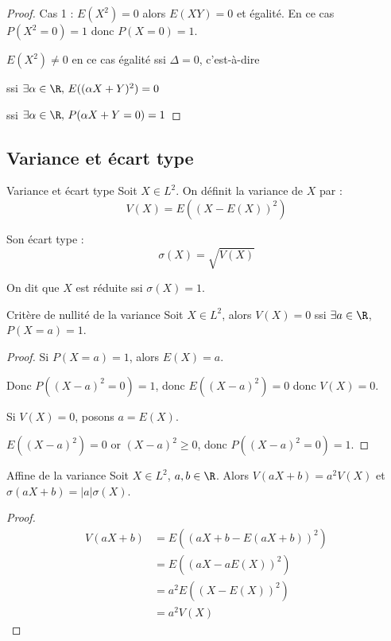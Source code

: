 \begin{proof}
    Cas 1 : $E(X^2) = 0$ alors $E(XY) =0$ et égalité. En ce cas $P(X^2 = 0) = 1$ donc 
    $P(X = 0) = 1$.

     $E(X^2) \neq 0$ en ce cas égalité ssi $\Delta = 0$, c'est-à-dire
    
    ssi $\exists \alpha \in \R, \, E((\alpha X + Y)^2) = 0$

    ssi $\exists \alpha \in \R, \, P(\alpha X + Y = 0) = 1$
\end{proof}

\subsection{Variance et écart type }

\begin{definition}{Variance et écart type}{}
    Soit $X \in L^2$. On définit la variance de $X$ par : 
    $$V(X) = E\left( (X - E(X))^2 \right) $$

    Son écart type : 
    $$ \sigma(X) = \sqrt{V(X)} $$

    On dit que $X$ est réduite ssi $\sigma(X) = 1$. 
\end{definition}

\begin{proposition}{Critère de nullité de la variance}{}
    Soit $X \in L^2$, alors $V(X) = 0$ ssi 
    $\exists a \in \R$, $P(X = a) = 1$.
\end{proposition}

\begin{proof}
    Si $P(X = a) = 1$, alors $E(X) = a$.

    Donc $P((X - a)^2 = 0) = 1$, donc $E((X - a)^2) = 0$ donc $V(X) = 0$.

     Si $V(X) = 0$, posons $a = E(X)$.

    $E((X - a)^2) = 0$ or $(X - a)^2 \geqslant 0$, donc $P((X - a)^2 = 0) = 1$.
\end{proof}

\begin{proposition}{Affine de la variance}{}
    Soit $X \in L^2$, $a, b \in \R$. Alors $V(a X + b) = a^2 V(X)$ et 
    $\sigma(a X + b) = |a| \sigma(X)$.
\end{proposition}

\begin{proof}
    \begin{align}
        V(a X + b) & = E\left( (a X + b - E(a X + b))^2 \right) \\
        & = E\left( (a X - a E(X))^2 \right) \\
        & = a^2 E\left( (X - E(X))^2 \right) \\
        & = a^2 V(X)        
    \end{align}
\end{proof}

